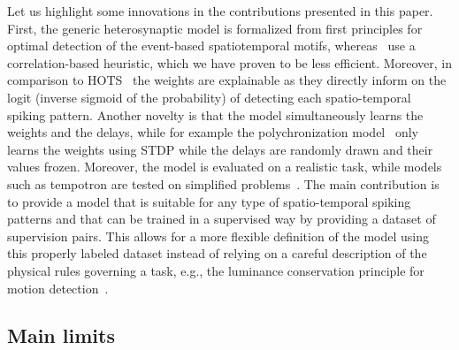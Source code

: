 \documentclass[default]{sn-jnl}%
\theoremstyle{thmstyleone}%
\theoremstyle{thmstyletwo}%
\theoremstyle{thmstylethree}%
\begin{document}
Let us highlight some innovations in the contributions presented in this paper. First, the generic heterosynaptic model is formalized from first principles for optimal detection of the event-based spatiotemporal motifs, whereas~\citet{ghosh_spatiotemporal_2019} use a correlation-based heuristic, which we have proven to be less efficient. Moreover, in comparison to HOTS~\citep{lagorce_hots_2017} the weights are explainable as they directly inform on the logit (inverse sigmoid of the probability) of detecting each spatio-temporal spiking pattern. Another novelty is that the model simultaneously learns the weights and the delays, while for example the polychronization model~\citep{izhikevich_polychronization_2006} only learns the weights using STDP while the delays are randomly drawn and their values frozen. Moreover, the model is evaluated on a realistic task, while models such as tempotron are tested on simplified problems~\citep{gutig_tempotron_2006}. The main contribution is to provide a model that is suitable for any type of spatio-temporal spiking patterns and that can be trained in a supervised way by providing a dataset of supervision pairs. This allows for a more flexible definition of the model using this properly labeled dataset instead of relying on a careful description of the physical rules governing a task, e.g., the luminance conservation principle for motion detection~\citep{benosman_asynchronous_2012, dardelet_event-by-event_2021}.

\subsection{Main limits}
\end{document}
